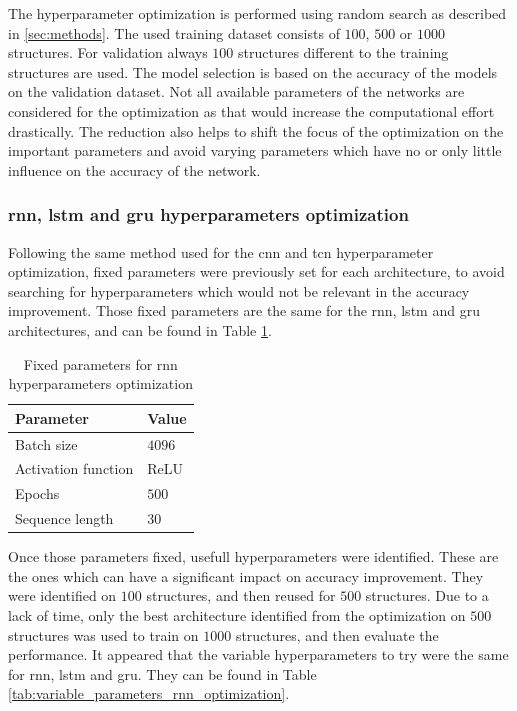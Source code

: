 \documentclass[conference]{IEEEtran}
\begin{document}
The hyperparameter optimization is performed using random search as described in \ref{sec:methods}. The used training dataset consists of $ 100 $, $ 500 $ or $ 1000 $ structures. For validation always $ 100 $ structures different to the training structures are used. The model selection is based on the accuracy of the models on the validation dataset. Not all available parameters of the networks are considered for the optimization as that would increase the computational effort drastically. The reduction also helps to shift the focus of the optimization on the important parameters and avoid varying parameters which have no or only little influence on the accuracy of the network.

\subsubsection{\gls{rnn}, \gls{lstm} and \gls{gru} hyperparameters optimization}

Following the same method used for the \gls{cnn} and \gls{tcn} hyperparameter optimization, fixed parameters were previously set for each architecture, to avoid searching for hyperparameters which would not be relevant in the accuracy improvement. Those fixed parameters are the same for the \gls{rnn}, \gls{lstm} and \gls{gru} architectures, and can be found in Table \ref{tab:fixed_parameters_rnn_optimization}.


\begin{table}[htp]
	\centering
	\caption{Fixed parameters for \gls{rnn} hyperparameters optimization}
	\label{tab:fixed_parameters_rnn_optimization}
	\begin{tabular}{ll}
		\textbf{Parameter} & \textbf{Value} \\
		\hline
		Batch size & $ 4096 $ \\
		Activation function & ReLU \\
		Epochs & $ 500 $ \\
		Sequence length & $ 30 $ 
	\end{tabular}
\end{table}


Once those parameters fixed, usefull hyperparameters were identified. These are the ones which can have a significant impact on accuracy improvement. They were identified on $ 100 $ structures, and then reused for $ 500 $ structures. Due to a lack of time, only the best architecture identified from the optimization on $ 500 $ structures was used to train on $ 1000 $ structures, and then evaluate the performance. It appeared that the variable hyperparameters to try were the same for \gls{rnn}, \gls{lstm} and \gls{gru}. They can be found in Table \ref{tab:variable_parameters_rnn_optimization}.
\end{document}
